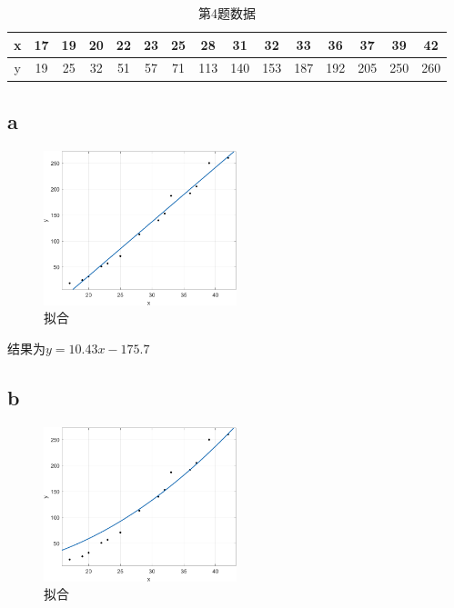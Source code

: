 \documentclass{article}
\begin{document}
\begin{table}[!h]
\begin{center}
\begin{tabular}{c|c c c c c c c c c c c c c c}
    x & 17 & 19 & 20 & 22 & 23 & 25 & 28 & 31 & 32 & 33 & 36 & 37 & 39 & 42   \\
    \hline
    y & 19 & 25 & 32 & 51 & 57 & 71 & 113 & 140 & 153 & 187 & 192 & 205 & 250 & 260  \\
\end{tabular}
\caption{\label{demo-table}第4题数据}
\end{center}
\end{table}

\subsection{a}
\begin{figure}[!h]
    \centering
    \includegraphics[width=0.5\textwidth]{picture/hw4_5.png}
    \caption{拟合}
\end{figure}

结果为$y = 10.43x - 175.7$

\subsection{b}
\begin{figure}[!h]
    \centering
    \includegraphics[width=0.5\textwidth]{picture/hw4_6.png}
    \caption{拟合}
\end{figure}
\end{document}

